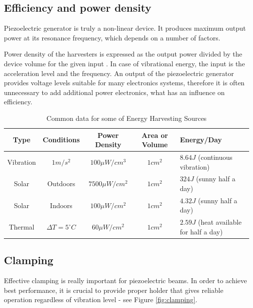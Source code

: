 \documentclass[12pt,a4paper]{article}
\begin{document}
\subsection{Efficiency and power density}
Piezoelectric generator is truly a non-linear device. It produces maximum output power at its resonance frequency, which depends on a number of factors. 
\par
Power density of the harvesters is expressed as the output power divided by the device volume for the given input \cite{EnHv2}. In case of vibrational energy, the input is the acceleration level and the frequency. An output of the piezoelectric generator provides voltage levels suitable for many electronics systems, therefore it is often unnecessary to add additional power electronics, what has an influence on efficiency.
\par
\begin{table}[ht!]
\small
\begin{center} 
\begin{tabular}{|c|c|c|c|l|}
\hline 
\textbf{Type} & \textbf{Conditions} & \textbf{Power Density} & \textbf{Area or Volume} & \textbf{Energy/Day} \\ 
\hline 
\hline
Vibration & $1m/s^2$ & $100\mu W/cm^3$ & $1cm^2$ & $8.64J$ (continuous vibration) \\ 
\hline 
Solar & Outdoors & $7500\mu W/cm^2$ & $1cm^2$ & $324J$ (sunny half a day) \\ 
\hline 
Solar & Indoors & $100\mu W/cm^2$ & $1cm^2$ & $4.32J$ (sunny half a day) \\ 
\hline 
Thermal & $\Delta T = 5 ^{\circ} C$ & $60\mu W/cm^2$ & $1cm^2$ & $2.59J$ (heat available for half a day) \\ 
\hline 
\end{tabular} 
\end{center}
\caption{Common data for some of Energy Harvesting Sources \cite{EnHv1}}
\label{tab:typdat}
\end{table}
\par

\subsection{Clamping}
Effective clamping is really important for piezoelectric beams. In order to achieve best performance, it is crucial to provide proper holder that gives reliable operation regardless of vibration level - see Figure \ref{fig:clamping}.\par
\end{document}
